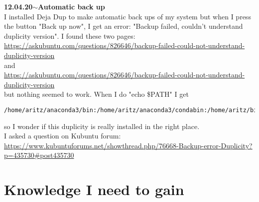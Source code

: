 \documentclass[11pt,a4paper]{article}
\newenvironment{loggentry}[2]%
{\noindent\textbf{#1}\hspace{1cm}$\mathbf{\sim}$\text{ }\textbf{#2}\\}{\vspace{0.5cm}}
\begin{document}
\begin{loggentry}{12.04.20}{Automatic back up}

I installed Deja Dup to make automatic back ups of my system but when I press the button "Back up now", I get an error: "Backup failed, couldn't understand duplicity version". I found these two pages:\\
\url{https://askubuntu.com/questions/826646/backup-failed-could-not-understand-duplicity-version}\\
and\\
\url{https://askubuntu.com/questions/826646/backup-failed-could-not-understand-duplicity-version}\\
but nothing seemed to work. When I do "echo \$PATH" I get
\begin{verbatim}
/home/aritz/anaconda3/bin:/home/aritz/anaconda3/condabin:/home/aritz/bin:/home/aritz/.local/bin:/usr/local/sbin:/usr/local/bin:/usr/sbin:/usr/bin:/sbin:/bin:/usr/games:/usr/local/games:/snap/bin
\end{verbatim}
so I wonder if this duplicity is really installed in the right place.\\

I asked a question on Kubuntu forum:\\
\url{https://www.kubuntuforums.net/showthread.php/76668-Backup-error-Duplicity?p=435730#post435730}\\


\end{loggentry}


\section{Knowledge I need to gain}
\end{document}
